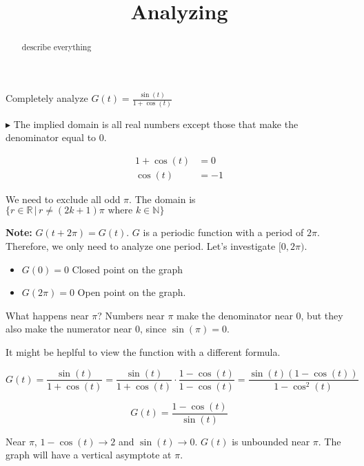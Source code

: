 \documentclass{ximera}
\title{Analyzing}
\begin{document}
\begin{abstract}
describe everything
\end{abstract}
\maketitle







Completely analyze $G(t) = \frac{\sin(t)}{1 + \cos(t)}$

$\blacktriangleright$  The implied domain is all real numbers except those that make the denominator equal to $0$.



\begin{align*}
1  + \cos(t) & = 0 \\
\cos(t) & = -1
\end{align*}


We need to exclude all odd $\pi$.  The domain is $\{  r \in \mathbb{R} \, | \, r \ne (2k+1)\pi \text{ where } k \in \mathbb{N}   \}$



\textbf{Note:} $G(t+2\pi) = G(t)$.  $G$ is a periodic function with a period of $2\pi$.  Therefore, we only need to analyze one period.  Let's investigate $[0, 2\pi)$.

\begin{itemize}
\item $G(0) = 0$   Closed point on the graph
\item $G(2\pi) = 0$  Open point on the graph.
\end{itemize}




What happens near $\pi$?  Numbers near $\pi$ make the denominator near $0$, but they also make the numerator near $0$, since $\sin(\pi)=0$.

It might be heplful to view the function with a different formula.


\[   G(t) = \frac{\sin(t)}{1 + \cos(t)}  = \frac{\sin(t)}{1 + \cos(t)}  \cdot \frac{1-\cos(t)}{1-\cos(t)} = \frac{\sin(t) (1-\cos(t))}{1-\cos^2(t)}    \]



\[    G(t) = \frac{1-\cos(t)}{\sin(t)}  \]


Near $\pi$, $1-\cos(t) \to 2$ and $\sin(t) \to 0$.  $G(t)$ is unbounded near $\pi$.  The graph will have a vertical asymptote at $\pi$.
\end{document}
